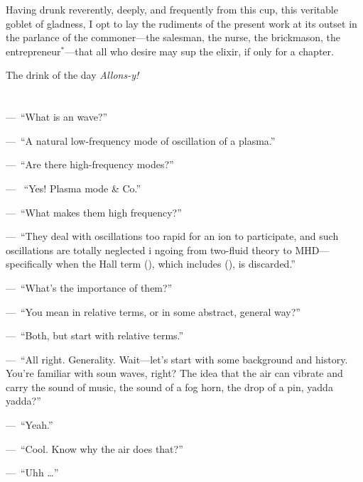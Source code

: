 Having drunk reverently, deeply, and frequently from this cup, this
veritable goblet of gladness, I opt to lay the rudiments of the
present work at its outset in the parlance of the commoner---the
salesman, the nurse, the brickmason, the entrepreneur$^*$---that all
who desire may sup the elixir, if only for a chapter.

The drink of the day \emph{Allons-y!}

\section{}

\newlength{\savedparindent}
\newlength{\savedparskip}
\setlength{\savedparindent}{\parindent}
\setlength{\savedparskip}{\parskip}

\setlength\parindent{0pt}
\setlength\parskip{1ex plus 2pt minus 1pt}
\newcommand\X{\par\noindent---~}


\X ``What is an \Alf wave?''  

\X ``A natural low-frequency mode of
oscillation of a plasma.''  

\X ``Are there high-frequency modes?''  

\X
``Yes! Plasma mode \& Co.''  

\X ``What makes them high frequency?''


\X ``They deal with oscillations too rapid for an ion to participate,
and such oscillations are totally neglected i ngoing from two-fluid
theory to MHD---specifically when the Hall term (), which includes (),
is discarded.''  

\X ``What's the importance of them?''  

\X ``You mean
in relative terms, or in some abstract, general way?''  

\X ``Both, but
start with relative terms.''  

\X ``All right. Generality. Wait---let's
start with some background and history. You're familiar with soun
waves, right? The idea that the air can vibrate and carry the sound of
music, the sound of a fog horn, the drop of a pin, yadda yadda?''

\X ``Yeah.''


\X ``Cool. Know why the air does that?''


\X ``Uhh \dots''


